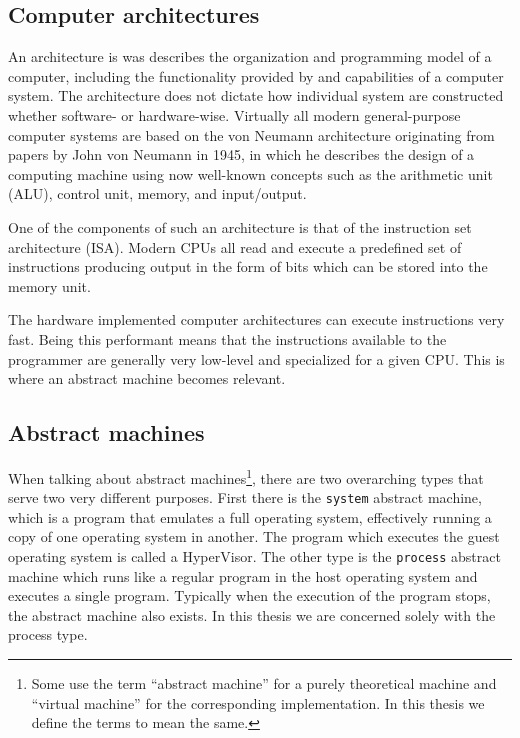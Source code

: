 
\subsection{Computer architectures}
\label{sec:background:computer-architectures}
An architecture is was describes the organization and programming model of a
computer, including the functionality provided by and capabilities of a computer
system\cite[ch. 1]{clements06}. The architecture does not dictate how individual
system are constructed whether software- or hardware-wise. Virtually all modern
general-purpose computer systems are based on the von Neumann architecture
originating from papers by John von Neumann in 1945\cite{riley87}, in which he
describes the design of a computing machine using now well-known concepts such
as the arithmetic unit (ALU), control unit, memory, and input/output.

One of the components of such an architecture is that of the instruction set
architecture (ISA). Modern CPUs all read and execute a predefined set of
instructions producing output in the form of bits which can be stored into the
memory unit.

The hardware implemented computer architectures can execute instructions very
fast.\cite{NEEDED} Being this performant means that the instructions available
to the programmer are generally very low-level and specialized for a given
CPU. This is where an abstract machine becomes relevant.

\subsection{Abstract machines}
\label{sec:background:abstract-machines}

When talking about abstract machines\footnote{Some use the term ``abstract
  machine'' for a purely theoretical machine and ``virtual machine'' for the
  corresponding implementation. In this thesis we define the terms to mean the
  same.}, there are two overarching types that serve two very different
purposes. First there is the \texttt{system} abstract machine, which is a
program that emulates a full operating system, effectively running a copy of one
operating system in another. The program which executes the guest operating
system is called a HyperVisor\cite{NEEDED}. The other type is the
\texttt{process} abstract machine which runs like a regular program in the host
operating system and executes a single program. Typically when the execution of
the program stops, the abstract machine also exists. In this thesis we are
concerned solely with the process type.

